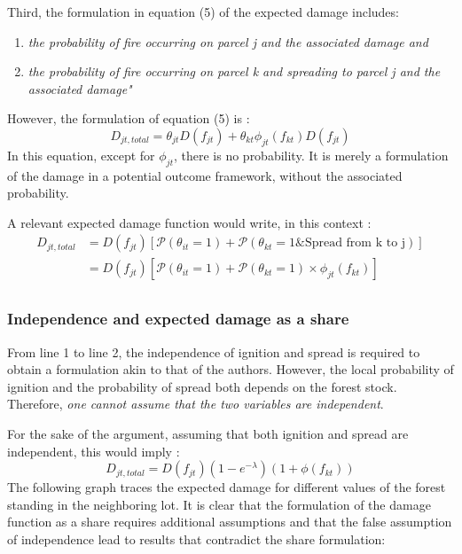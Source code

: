 \documentclass[
]{article}
\begin{document}
Third, the formulation in equation (5) of the expected damage includes:

\begin{displayquote}
\begin{enumerate}
\item\textit{ the probability of fire occurring on parcel j and the associated damage and }
\item \textit{the probability of fire
occurring on parcel k and spreading to parcel j and the associated damage"}
\end{enumerate}
\end{displayquote}

However, the formulation of equation (5) is : \begin{equation*}
    D_{jt,total}=\theta_{jt}D(f_{jt})+\theta_{kt}\phi_{jt}(f_{kt})D(f_{jt})
\end{equation*} In this equation, except for \(\phi_{jt}\), there is no
probability. It is merely a formulation of the damage in a potential
outcome framework, without the associated probability.

A relevant expected damage function would write, in this context :
\begin{align*}
    D_{jt,total}&=D(f_{jt})\left[ \mathcal{P}(\theta_{it}=1)+\mathcal{P}(\theta_{kt}=1 \& \text{Spread from k to j}) \right]\\
    &=D(f_{jt})\left[ \mathcal{P}(\theta_{it}=1)+\mathcal{P}(\theta_{kt}=1)\times \phi_{jt}(f_{kt}) \right]\\
\end{align*}

\subsubsection{Independence and expected damage as a share}

From line 1 to line 2, the independence of ignition and spread is
required to obtain a formulation akin to that of the authors. However,
the local probability of ignition and the probability of spread both
depends on the forest stock. Therefore,
\textit{one cannot assume that the two variables are independent}.

For the sake of the argument, assuming that both ignition and spread are
independent, this would imply : \[
 D_{jt,total}=D(f_{jt})(1-e^{-\lambda})(1+\phi(f_{kt}))
\] The following graph traces the expected damage for different values
of the forest standing in the neighboring lot. It is clear that the
formulation of the damage function as a share requires additional
assumptions and that the false assumption of independence lead to
results that contradict the share formulation:
\end{document}
